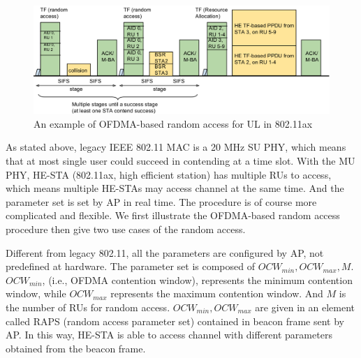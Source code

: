 

\begin{figure}[!t]
\centering
\includegraphics[scale=0.35]{./figure/chp2/RA_illu_2.png}
\caption{An example of OFDMA-based random access for UL in 802.11ax}
\label{fig_ra_ul}
\end{figure}

As stated above, legacy IEEE 802.11 MAC is a 20 MHz SU PHY, which means that at most single user could succeed in contending at a time slot.
With the MU PHY, HE-STA (802.11ax, high efficient station) has multiple RUs to access, which means multiple HE-STAs may access channel at the same time.
And the parameter set is set by AP in real time.
The procedure is of course more complicated and flexible.
We first illustrate the OFDMA-based random access procedure then give two use cases of the random access.

Different from legacy 802.11, all the parameters are configured by AP, not predefined at hardware. 
The parameter set is composed of $OCW_{min}, OCW_{max}, M$. $OCW_{min}$, (i.e., OFDMA contention window), represents the minimum contention window, while $OCW_{max}$ represents the maximum contention window. 
And $M$ is the number of RUs for random access. $OCW_{min}, OCW_{max}$ are given in an element called RAPS (random access parameter set) contained in beacon frame sent by AP.
In this way, HE-STA is able to access channel with different parameters obtained from the beacon frame. 


